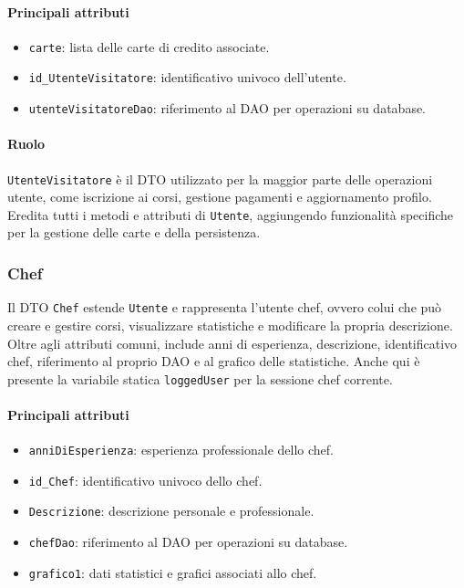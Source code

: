 \paragraph{Principali attributi}
\begin{itemize}
    \item \texttt{carte}: lista delle carte di credito associate.
    \item \texttt{id\_UtenteVisitatore}: identificativo univoco dell'utente.
    \item \texttt{utenteVisitatoreDao}: riferimento al DAO per operazioni su database.
\end{itemize}

\paragraph{Ruolo}
\texttt{UtenteVisitatore} è il DTO utilizzato per la maggior parte delle operazioni utente, come iscrizione ai corsi, gestione pagamenti e aggiornamento profilo. Eredita tutti i metodi e attributi di \texttt{Utente}, aggiungendo funzionalità specifiche per la gestione delle carte e della persistenza.

\subsubsection{Chef}
Il DTO \texttt{Chef} estende \texttt{Utente} e rappresenta l'utente chef, ovvero colui che può creare e gestire corsi, visualizzare statistiche e modificare la propria descrizione. Oltre agli attributi comuni, include anni di esperienza, descrizione, identificativo chef, riferimento al proprio DAO e al grafico delle statistiche. Anche qui è presente la variabile statica \texttt{loggedUser} per la sessione chef corrente.

\paragraph{Principali attributi}
\begin{itemize}
    \item \texttt{anniDiEsperienza}: esperienza professionale dello chef.
    \item \texttt{id\_Chef}: identificativo univoco dello chef.
    \item \texttt{Descrizione}: descrizione personale e professionale.
    \item \texttt{chefDao}: riferimento al DAO per operazioni su database.
    \item \texttt{grafico1}: dati statistici e grafici associati allo chef.
\end{itemize}

